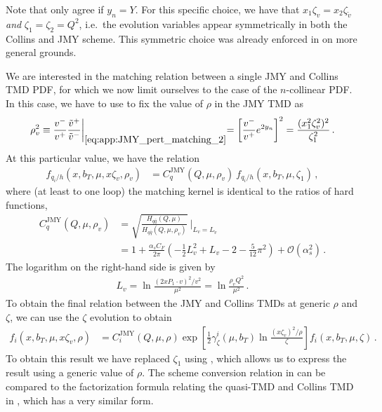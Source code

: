 \documentclass[11pt,a4paper]{article}
\newcommand{\cO}{\mathcal{O}}
\newcommand{\nn}{\nonumber}
\newcommand{\as}{\alpha_s}
\newcommand{\tv}{{\tilde v}}
\newcommand{\q}{q_i}
\newcommand{\JMY}{\mathrm{JMY}}
\begin{document}
Note that  only agree if $y_n = Y$.
For this specific choice, we have that $x_1 \zeta_v = x_2 \zeta_\tv$ \emph{and} $\zeta_1 = \zeta_2 = Q^2$,
i.e.~the evolution variables appear symmetrically in both the Collins and JMY scheme.
This symmetric choice was already enforced in  on more general grounds.

We are interested in the matching relation between a single JMY and Collins TMD PDF,
for which we now limit ourselves to the case of the $n$-collinear PDF.
In this case, we have to use  to fix the value
of $\rho$ in the JMY TMD as
\begin{align} \label{eq:def_rho_v}
 \rho_v^2
 \equiv \frac{v^-}{v^+} \frac{\tv^+}{\tv^-} \biggl|_{\eqref{eq:app:JMY_pert_matching_2}}
 = \left[ \frac{v^-}{v^+} e^{2 y_n} \right]^2
 = \frac{(x_1^2 \zeta_v^2)^2}{\zeta_1^2}
\,.\end{align}
At this particular value, we have the relation
\begin{align}
 f_{\q/h}(x, b_T, \mu, x \zeta_v, \rho_v) &
 = C_q^\JMY(Q,\mu, \rho_v)\: f_{\q/h}(x, b_T, \mu, \zeta_1)
\,,\end{align}
where (at least to one loop) the matching kernel is identical to the ratios of hard functions,
\begin{align} \label{eq:app:matching_JMY}
 C_q^\JMY(Q,\mu, \rho_v) &
 = \sqrt{\frac{H_{q \bar q}(Q, \mu)}{H_{q \bar q}(Q, \mu, \rho_v)}} \: \Biggl|_{L_v = L_\tv}
 \nn\\&
 = 1 + \frac{\as C_F}{2\pi} \left( -  \frac12 L_v^2 + L_v - 2 - \frac{5}{12} \pi^2 \right) + \cO(\as^2)
\,.\end{align}
The logarithm on the right-hand side is given by
\begin{align}
 L_v = \ln \frac{(2 x P_1 \cdot v)^2 / v^2}{\mu^2}
     = \ln \frac{\rho_v Q^2}{\mu^2}
\,.\end{align}
To obtain the final relation between the JMY and Collins TMDs at generic $\rho$ and $\zeta$,
we can use the $\zeta$ evolution to obtain
\begin{align} \label{eq:JMYtoCollins}
 f_i(x, b_T, \mu, x \zeta_v, \rho) &
 = C_i^\JMY(Q,\mu, \rho)
   \exp\left[ \frac12 \gamma_\zeta^i(\mu, b_T) \ln\frac{(x \zeta_v)^2 / \rho}{\zeta} \right]
   f_{i}(x, b_T, \mu, \zeta)
\,.\end{align}
To obtain this result we have replaced $\zeta_1$ using ,
which allows us to express the result using a generic value of $\rho$.  The scheme conversion relation in  can be compared to the factorization formula relating the quasi-TMD and Collins TMD in , which has a very similar form.
\end{document}
